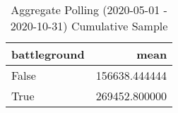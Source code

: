 \begin{table}
\centering
\caption{Aggregate Polling (2020-05-01 - 2020-10-31) Cumulative Sample}
\label{table:aggregate\_polling\_2020-05-01\_-\_2020-10-31\_cumulative\_sample}
\begin{tabular}{lr}
\toprule
 battleground &           mean \\
\midrule
        False &  156638.444444 \\
         True &  269452.800000 \\
\bottomrule
\end{tabular}
\end{table}
